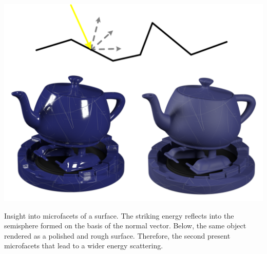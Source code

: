 \begin{marginfigure}[3cm]
	\includegraphics{figs/fundamentals/microfacets.png}
	\caption{Insight into microfacets of a surface. The striking energy reflects into the semisphere formed on the basis of the normal vector. Below, the same object rendered as a polished and rough surface. Therefore, the second present microfacets that lead to a wider energy scattering.}
	\label{fig:microfacets}
\end{marginfigure}
